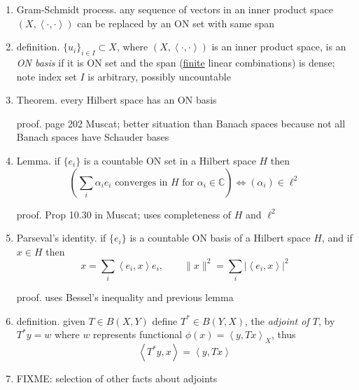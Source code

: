\documentclass[11pt]{article}
\newcommand{\CC}{\mathbb{C}}
\newcommand{\ip}[2]{\ensuremath{\left<#1,#2\right>}}
\begin{document}
\begin{enumerate}
\item Gram-Schmidt process.  any sequence of vectors in an inner product space $(X,\ip{\cdot}{\cdot})$ can be replaced by an ON set with same span

\item definition. $\{u_i\}_{i\in I} \subset X$, where $(X,\ip{\cdot}{\cdot})$ is an inner product space, is an \emph{ON basis} if it is ON set and the span (\underline{finite} linear combinations) is dense; note index set $I$ is arbitrary, possibly uncountable

\item Theorem. every Hilbert space has an ON basis

proof. page 202 Muscat; better situation than Banach spaces because not all Banach spaces have Schauder bases

\item Lemma.  if $\{e_i\}$ is a countable ON set in a Hilbert space $H$ then
    $$\left(\sum_i \alpha_i e_i \text{ converges in $H$ for $\alpha_i\in \CC$}\right) \iff (\alpha_i)\in \ell^2$$

proof. Prop 10.30 in Muscat; uses completeness of $H$ and $\ell^2$

\item Parseval's identity. if $\{e_i\}$ is a countable ON basis of a Hilbert space $H$, and if $x\in H$ then
    $$x = \sum_i \ip{e_i}{x}e_i, \qquad \|x\|^2 = \sum_i |\ip{e_i}{x}|^2$$

proof. uses Bessel's inequality and previous lemma

\item definition. given $T\in B(X,Y)$ define $T^*\in B(Y,X)$, the \emph{adjoint of $T$}, by $T^*y=w$ where $w$ represents functional $\phi(x) = \ip{y}{Tx}_X$, thus
    $$\ip{T^*y}{x} = \ip{y}{Tx}$$

\item FIXME: selection of other facts about adjoints

\end{enumerate}
\end{document}
